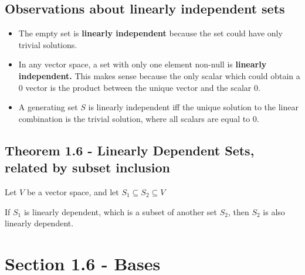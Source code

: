 \documentclass{article}
\begin{document}
\subsection*{Observations about linearly independent sets}
\begin{itemize}
    \item The empty set is \textbf{linearly independent} because the set could have only trivial solutions. 
    \item In any vector space, a set with only one element non-null is \textbf{linearly independent.} This makes sense because the only scalar which could obtain a 0 vector is the product between the unique vector and the scalar 0.
    \item A generating set \(S\) is linearly independent iff the unique solution to the linear combination is the trivial solution, where all scalars are equal to 0.
\end{itemize}

\subsection*{Theorem 1.6 - Linearly Dependent Sets, related by subset inclusion}

Let \(V\) be a vector space, and let \(S_1 \subseteq S_2 \subseteq V\)

If \(S_1\) is linearly dependent, which is a subset of another set \(S_2\), then \(S_2\) is also linearly dependent.

\section*{Section 1.6 - Bases}
\end{document}
